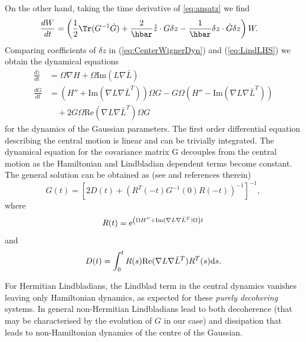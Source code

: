 \documentclass[12pt]{iopart} %
\begin{document}
On the other hand, taking the time derivative of \cref{eq:ansatz} we find
\begin{equation} \label{eq:LindLHS}
	\begin{aligned}
	 \frac{dW}{dt}&= \left(\frac12\Tr(G^{-1}\dot G)+\frac{2}{\hbar}\dot{\tilde{z}}\cdot G \delta z-\frac{1}{\hbar}\delta z \cdot \dot{G}\delta z \right)W.
	\end{aligned}
\end{equation}
Comparing coefficients of  $\delta z$ in (\ref{eq:CenterWignerDyn}) and (\ref{eq:LindLHS}) we obtain the dynamical equations 
\begin{equation} 
    \begin{aligned} \label{eq:LindSemi}
    \frac{d \tilde z}{d t} &= \Omega \nabla H+\Omega \text{Im} (L \nabla \bar{L})\\
  	\frac{dG}{dt} &=\left(H''+\text{Im}(\nabla L \nabla \bar{L}^{T})\right)\Omega G-G\Omega\left(H''-\text{Im}(\nabla L \nabla \bar{L}^{T})\right)\\
	&\quad +2 G \Omega \text{Re}(\nabla L \nabla \bar{L}^T) \Omega G
    \end{aligned}
\end{equation}
for the dynamics of the Gaussian parameters. The first order differential equation describing the central motion is linear and can be trivially integrated. The dynamical equation for the covariance matrix G decouples from the central motion as the Hamiltonian and Lindbladian dependent terms become constant. The general solution can be obtained as (see \cite{plastow2020semiclassical} and references therein)
\begin{equation}
G(t)=\left[2D(t)+(R^T(-t)G^{-1}(0)R(-t))^{-1}\right]^{-1},
\end{equation}
where 
\begin{equation}
    R(t)={\rm e}^{\left(\Omega H''+\text{Im}(\nabla L \nabla \bar{L}^{T})\Omega\right)t}
\end{equation} 
and
\begin{equation}
    D(t)=\int_0^t R(s) \text{Re}(\nabla L \nabla \bar{L}^T) R^T(s){\rm d}s.
\end{equation}

For Hermitian Lindbladians, the Lindblad term in the central dynamics vanishes leaving only Hamiltonian dynamics, as expected for these \textit{purely decohering} systems. In general non-Hermitian Lindbladians lead to both decoherence (that may be characterised by the evolution of $G$ in our case) and dissipation that leads to non-Hamiltonian dynamics of the centre of the Gaussian. 
\end{document}
